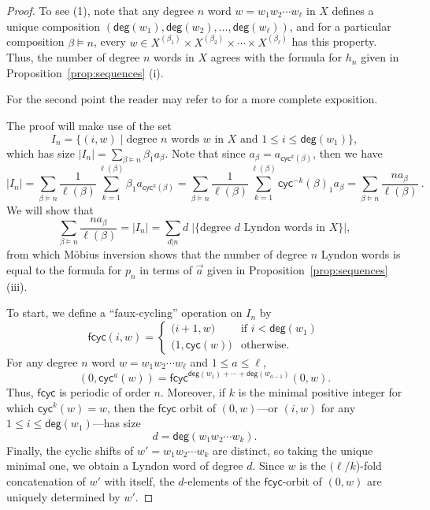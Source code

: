 \documentclass[11pt]{amsart}
\theoremstyle{definition}
\numberwithin{equation}{section}
\begin{document}
\begin{proof}
To see (1), note that any degree $n$ word $w = w_1 w_2 \cdots w_{\ell}$ in $X$
defines a unique composition $(\mathsf{deg}(w_{1}), \mathsf{deg}(w_{2}), \ldots, \mathsf{deg}(w_{\ell}))$,
and for a particular composition $\beta \vDash n$,
every $w \in X^{(\beta_{1})} \times X^{(\beta_{2})} \times \cdots \times X^{(\beta_{\ell})}$ has this property.
Thus, the number of degree $n$ words in $X$ agrees with the formula for $h_{n}$ given in Proposition~\ref{prop:sequences} (i).  

For the second point the reader may refer to \cite[Theorem 4.9, Theorem 5.1]{Reutenauer-FreeLieAlgebras}
for a more complete exposition.

The proof will make use of the set
\[
I_{n} = \{ (i, w) \;|\; \text{degree $n$ words $w$ in $X$ and $1 \le i \le \mathsf{deg}(w_{1})$}\},
\]
which has size
$
|I_{n}| = \sum_{\beta \vDash n} \beta_{1} a_{\beta} .
$
Note that since $a_\beta = a_{\mathsf{cyc}^k(\beta)}$, then we have
\[
|I_{n}|
= \sum_{\beta \vDash n} \frac{1}{\ell(\beta)}
\sum_{k=1}^{\ell(\beta)} \beta_{1} a_{\mathsf{cyc}^{k}(\beta)}
= \sum_{\beta \vDash n} \frac{1}{\ell(\beta)}
\sum_{k=1}^{\ell(\beta)} \mathsf{cyc}^{-k}(\beta)_{1} a_{\beta}
= \sum_{\beta \vDash n} \frac{n a_{\beta}}{\ell(\beta)}~.
\]
We will show that 
\begin{equation}
\label{eq:LyndonMobius}
\sum_{\beta \vDash n} \frac{n a_{\beta}}{\ell(\beta)} = |I_{n}| = \sum_{d | n} d \; |\{\text{degree $d$ Lyndon words in $X$}\}|,
\end{equation}
from which M\"{o}bius inversion shows that the number of degree $n$ Lyndon words is equal to the formula for $p_{n}$ in terms of $\vec{a}$ given in Proposition~\ref{prop:sequences} (iii).

To start, we define a ``faux-cycling'' operation on $I_{n}$ by
\[
\mathsf{fcyc}(i, w) = \begin{cases} 
\big(i+1, w\big) & \text{if $i < \mathsf{deg}(w_{1})$} \\ 
\big(1, \mathsf{cyc}(w)\big) & \text{otherwise}.
\end{cases}
\]
For any degree $n$ word $w = w_{1} w_{2} \cdots w_{\ell}$ and  $1 \le a \le \ell$, 
\[
(0, \mathsf{cyc}^{a}(w)) = \mathsf{fcyc}^{\mathsf{deg}(w_{1}) + \cdots + \mathsf{deg}(w_{a-1})} (0, w).
\]
Thus, $\mathsf{fcyc}$ is periodic of order $n$.  Moreover, if $k$ is the minimal positive integer for which $\mathsf{cyc}^{k}(w) = w$, then the $\mathsf{fcyc}$ orbit of $(0, w)$---or $(i, w)$ for any $1 \le i \le \mathsf{deg}(w_{1})$---has size
\[
d = \mathsf{deg}(w_{1}w_{2}\cdots w_{k}).
\]
Finally, the cyclic shifts of $w' = w_{1}w_{2}\cdots w_{k}$ are distinct, so taking the unique minimal one, we obtain a Lyndon word of degree $d$.  Since $w$ is the $(\ell/k$)-fold concatenation of $w'$ with itself, the $d$-elements of the $\mathsf{fcyc}$-orbit of $(0, w)$ are uniquely determined by $w'$.
\end{proof}
\end{document}
